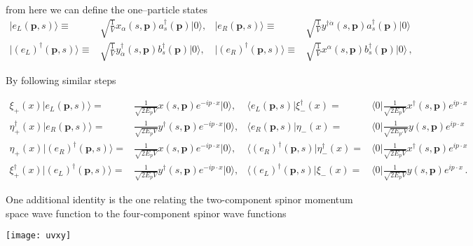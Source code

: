 \begin{frame}
from here we can define the one--particle states  
\begin{align}
  \label{eq:77f}
   | e_L(\mathbf{p},s)\rangle\equiv&\sqrt{\frac{1}{V}}x_{\alpha}\left(s,\mathbf{p}\right) a^\dagger_s(\mathbf{p})|0\rangle, &    | e_R(\mathbf{p},s)\rangle\equiv&\sqrt{\frac{1}{V}}y^{\dagger\dot{\alpha}}\left(s,\mathbf{p}\right)a^\dagger_s(\mathbf{p})|0\rangle\nonumber\\
   | \left( e_L \right)^{\dagger}(\mathbf{p},s)\rangle\equiv&\sqrt{\frac{1}{V}}y_{\dot{\alpha}}^{\dagger}\left(s,\mathbf{p}\right){b}^\dagger_s(\mathbf{p})|0\rangle,&
   | \left( e_R \right)^{\dagger}(\mathbf{p},s)\rangle\equiv&\sqrt{\frac{1}{V}}x^{\alpha}\left(s,\mathbf{p}\right){b}^\dagger_s(\mathbf{p})|0\rangle\,, 
\end{align}
\end{frame}

By following similar steps
\begin{frame}
  \begin{align}
 \xi_+(x)|e_{L}(\mathbf{p},s)\rangle=&\frac{1}{\sqrt{2 E_p V}}x(s,\mathbf{p})e^{-i p\cdot x}|0\rangle,&
  \langle e_{L}(\mathbf{p},s)|\xi_-^{\dagger}(x)=&\langle 0|\frac{1}{\sqrt{2 E_p V}}x^{\dagger}(s,\mathbf{p})e^{i p\cdot x}\nonumber\\
  \eta_+^{\dagger}(x)|e_R (\mathbf{p},s)\rangle=&\frac{1}{\sqrt{2 E_{p} V}}y^{\dagger}(s,\mathbf{p})e^{-i p\cdot x}|0\rangle,&
  \langle e_R(\mathbf{p},s)|\eta_-(x)=&\langle 0|\frac{1}{\sqrt{2 E_{p'} V}}y(s,\mathbf{p})e^{i p\cdot x} \nonumber\\
  \eta_+(x)|\left( e_R \right)^{\dagger}(\mathbf{p},s)\rangle=&\frac{1}{\sqrt{2 E_{p} V}}x(s,\mathbf{p})e^{-i p\cdot x}|0\rangle,&
  \langle \left( e_R \right)^{\dagger}(\mathbf{p},s)|\eta^{\dagger}_-(x)=&\langle 0|\frac{1}{\sqrt{2 E_{p} V}}x^{\dagger}(s,\mathbf{p})e^{i p\cdot x} \nonumber\\
  \xi_+^{\dagger}(x)|\left( e_{L} \right)^{\dagger}(\mathbf{p},s)\rangle=&\frac{1}{\sqrt{2 E_p V}}y^{\dagger}(s,\mathbf{p})e^{-i p\cdot x}|0\rangle,&
  \langle\left( e_{L} \right)^{\dagger}(\mathbf{p},s)|\xi_-(x)=&\langle 0| \frac{1}{\sqrt{2 E_p V}}y(s,\mathbf{p})e^{i p\cdot x}
 \,.
\end{align}  
\end{frame}

\begin{frame}
One additional identity is the one relating the two-component spinor momentum space wave function to the four-component spinor wave functions

\texttt{[image: uvxy]}
\end{frame}











